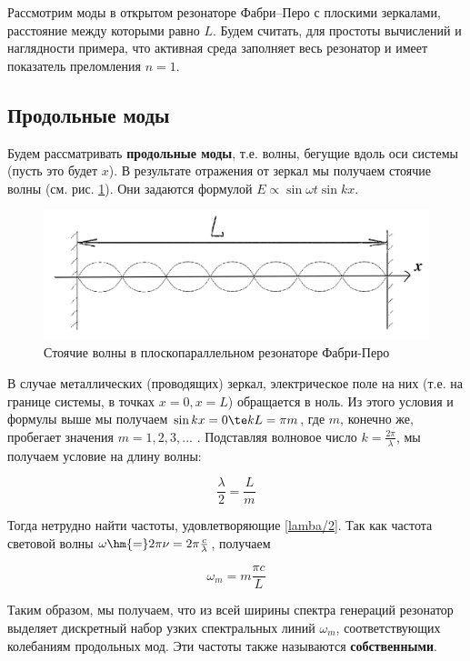 \documentclass[12pt]{kiarticle}
\begin{document}
Рассмотрим моды в открытом резонаторе Фабри–Перо с плоскими
зеркалами, расстояние между которыми равно $ L $. Будем считать, для
простоты вычислений и наглядности примера, что активная среда заполняет весь резонатор и имеет показатель преломления $ n= 1 $.

\subsection{Продольные моды}

Будем рассматривать \textbf{продольные моды}, т.е. волны, бегущие вдоль оси системы (пусть это будет $ x $). В результате отражения от зеркал мы получаем стоячие волны (см. рис. \ref{FP_waves}). Они задаются формулой $ E \propto \sin{\omega t} \sin{kx} $.

\begin{figure}[h!]
	\centering
	\includegraphics[width=0.6\linewidth]{FP_waves.png}
	\caption{Стоячие волны в плоскопараллельном резонаторе Фабри-Перо}
	\label{FP_waves}
\end{figure}

В случае металлических (проводящих) зеркал, электрическое поле на них (т.е. на границе системы, в точках $ x = 0, x = L $) обращается в ноль. Из этого условия и формулы выше мы получаем $ \sin{kx} = 0 \te kL =\pi m $, где $ m $, конечно же, пробегает значения $ m = 1, 2, 3, ... $ .  Подставляя волновое число $ k = \frac{2\pi}{\lambda} $, мы получаем условие на длину волны:

\begin{equation}\label{lamba/2}
\dfrac{\lambda}{2} = \dfrac{L}{m}
\end{equation}

Тогда нетрудно найти частоты, удовлетворяющие \eqref{lamba/2}. Так как частота световой волны $ \omega \hm{=} 2\pi \nu = 2 \pi \frac{c}{\lambda} $, получаем 

\begin{equation}\label{omega_m}
\omega_m = m \dfrac{\pi c}{L}
\end{equation}

Таким образом, мы получаем, что из всей ширины спектра генераций резонатор выделяет дискретный набор узких спектральных линий $ \omega_m $, соответствующих колебаниям продольных мод. Эти частоты также называются \textbf{собственными}. 
\end{document}
